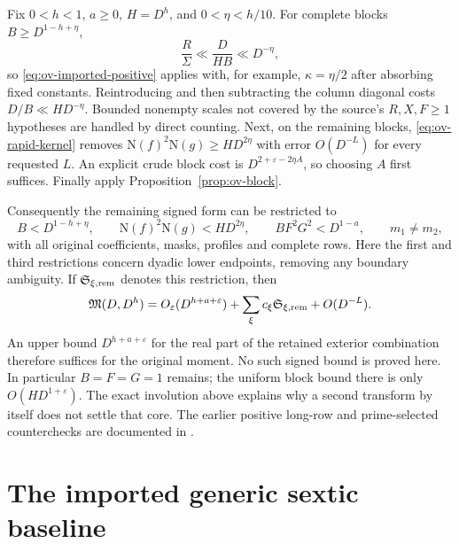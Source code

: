 \documentclass[11pt]{article}
\numberwithin{equation}{section}
\theoremstyle{definition}
\theoremstyle{remark}
\newcommand{\N}{\mathrm N}
\newcommand{\Mfrak}{\mathfrak M}
\newcommand{\eps}{\varepsilon}
\begin{document}
Fix \(0<h<1\), \(a\ge0\), \(H=D^h\), and \(0<\eta<h/10\).
For complete blocks \(B\ge D^{1-h+\eta}\),
\[
 \frac R\Sigma\ll\frac{D}{HB}\ll D^{-\eta},
\]
so \eqref{eq:ov-imported-positive} applies with, for example,
\(\kappa=\eta/2\) after absorbing fixed constants.
Reintroducing and then subtracting the column diagonal costs
\(D/B\ll HD^{-\eta}\). Bounded nonempty scales not covered by
the source's \(R,X,F\ge1\) hypotheses are handled by direct counting.
Next, on the remaining blocks,
\eqref{eq:ov-rapid-kernel} removes
\(\N(f)^2\N(g)\ge HD^{2\eta}\) with error \(O(D^{-L})\)
for every requested \(L\). An explicit crude block cost is
\(D^{2+\eps-2\eta A}\), so choosing \(A\) first suffices.
Finally apply Proposition~\ref{prop:ov-block}.

Consequently the remaining signed form can be restricted to
\begin{equation}\label{eq:ov-residual}
 B<D^{1-h+\eta},\qquad
 \N(f)^2\N(g)<HD^{2\eta},\qquad
 BF^2G^2<D^{1-a},\qquad m_1\ne m_2,
\end{equation}
with all original coefficients, masks, profiles and complete rows.
Here the first and third restrictions concern dyadic lower endpoints,
removing any boundary ambiguity. If \(\mathfrak S_{\xi,\rm rem}\)
denotes this restriction, then
\[
 \Mfrak(D,D^h)=O_\eps(D^{h+a+\eps})
       +\sum_\xi c_\xi\mathfrak S_{\xi,\rm rem}+O(D^{-L}).
\]
An upper bound \(D^{h+a+\eps}\) for the real part of the retained
exterior combination therefore suffices for the original moment.
No such signed bound is proved here.
In particular \(B=F=G=1\) remains; the uniform block bound there
is only \(O(HD^{1+\eps})\).
The exact involution above explains why a second transform by itself
does not settle that core. The earlier positive long-row and
prime-selected counterchecks are documented in \cite{N2,N3,N7}.

\section{The imported generic sextic baseline}
\label{sec:generic-sextic-baseline}
\end{document}
